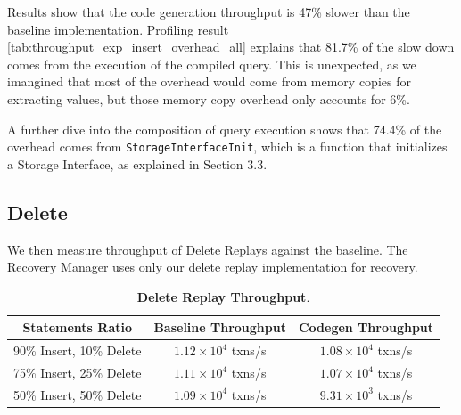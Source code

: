 \documentclass[12pt]{cmuthesis}
\begin{document}
\begin{table}[H]
\begin{center}
\caption{\textbf{Callgrind breakdown on the Query Execution step of an Insert Replay step}.}
\label{tab:throughput_exp_insert_overhead_all}
\end{center}
\end{table}
Results show that the code generation throughput is 47\% slower than the baseline implementation. Profiling result \cref{tab:throughput_exp_insert_overhead_all} explains that 81.7\% of the slow down comes from the execution of the compiled query. This is unexpected, as we imangined that most of the overhead would come from memory copies for extracting values, but those memory copy overhead only accounts for 6\%.

A further dive into the composition of query execution shows that 74.4\% of the overhead comes from \texttt{StorageInterfaceInit}, which is a function that initializes a Storage Interface, as explained in Section 3.3. 

\subsection{Delete}
We then measure throughput of Delete Replays against the baseline. The Recovery Manager uses only our delete replay implementation for recovery.
\begin{table}[H]
\begin{center}
\begin{tabular}{ c c c } 
 \toprule
\textbf{Statements Ratio} & \textbf{Baseline Throughput} & \textbf{Codegen Throughput}\\
 \toprule
 90\% Insert, 10\% Delete & $1.12 \times 10^4$ txns/s & $1.08\times 10^4$ txns/s \\ 
 \midrule
 75\% Insert, 25\% Delete & $1.11 \times 10^4$ txns/s & $1.07 \times 10^4$ txns/s\\
 \midrule
 50\% Insert, 50\% Delete & $1.09 \times 10^4$ txns/s & $9.31 \times 10^3$ txns/s\\
 \bottomrule
\end{tabular}
\caption{\textbf{Delete Replay Throughput}.}
\label{tab:throughput_exp_delete}
\end{center}
\end{table}
\end{document}
